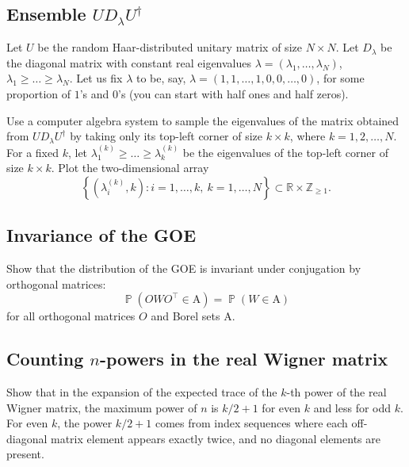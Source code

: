 \documentclass[letterpaper,11pt,oneside,reqno]{book}
\numberwithin{equation}{chapter}  %
\theoremstyle{definition}
\begin{document}
\subsection{Ensemble $UD_\lambda U^\dagger$}

Let $U$ be the random Haar-distributed unitary matrix of size $N\times N$.
Let $D_\lambda$ be the diagonal matrix with constant real eigenvalues
$\lambda=(\lambda_1,\ldots,\lambda_N)$,
$\lambda_1\ge \ldots\ge \lambda_N$.
Let us fix $\lambda$ to be, say, $\lambda=(1,1,\ldots,1,0,0,\ldots,0  )$,
for some proportion of $1$'s and $0$'s (you can start with half
ones and half zeros).

Use a computer algebra system to
sample the eigenvalues of the matrix
obtained from $UD_\lambda U^\dagger$
by taking only its top-left corner of size $k\times k$,
where $k=1,2,\ldots,N $.
For a fixed $k$, let
$\lambda_1^{(k)}\ge \ldots\ge \lambda_k^{(k)}$
be the eigenvalues of the top-left corner of size $k\times k$.
Plot the two-dimensional array
\begin{equation*}
	\left\{ (\lambda_i^{(k)},k)\colon i=1,\ldots,k,\ k=1,\ldots,N  \right\}\subset \mathbb{R}\times
	\mathbb{Z}_{\ge1}.
\end{equation*}

\subsection{Invariance of the GOE}

Show that the distribution of the GOE is invariant under
conjugation by orthogonal matrices:
\begin{equation*}
	\operatorname{\mathbb{P}}(O W O^\top \in \mathrm{A}) = \operatorname{\mathbb{P}}(W \in \mathrm{A})
\end{equation*}
for all orthogonal matrices $O$ and Borel sets $\mathrm{A}$.

\subsection{Counting $n$-powers in the real Wigner matrix}
\label{lecture1:prob:counting-n-powers}

Show that in the expansion of the expected trace of the
$k$-th power of the real Wigner matrix, the maximum power of
$n$ is $k/2+1$ for even $k$ and less for odd $k$. For even
$k$, the power $k/2+1$ comes from index sequences where each
off-diagonal matrix element appears exactly twice, and no
diagonal elements are present.
\end{document}

